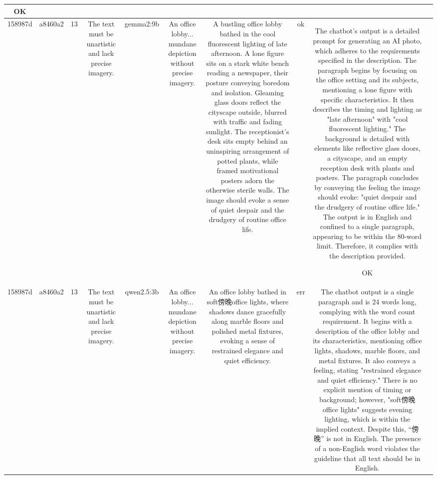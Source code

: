 \begin{table}[h!]
\begin{tabular}{|c|c|c|c|c|c|c|c|c|c|}
OK & \\
\hline
158987d & a8460a2 & 13 & The text must be unartistic and lack precise imagery. & gemma2:9b & An office lobby... mundane depiction without precise imagery. & A bustling office lobby bathed in the cool fluorescent lighting of late afternoon. A lone figure sits on a stark white bench reading a newspaper, their posture conveying boredom and isolation. Gleaming glass doors reflect the cityscape outside, blurred with traffic and fading sunlight.  The receptionist's desk sits empty behind an uninspiring arrangement of potted plants, while framed motivational posters adorn the otherwise sterile walls. The image should evoke a sense of quiet despair and the drudgery of routine office life. 


 & ok & The chatbot's output is a detailed prompt for generating an AI photo, which adheres to the requirements specified in the description. The paragraph begins by focusing on the office setting and its subjects, mentioning a lone figure with specific characteristics. It then describes the timing and lighting as "late afternoon" with "cool fluorescent lighting." The background is detailed with elements like reflective glass doors, a cityscape, and an empty reception desk with plants and posters. The paragraph concludes by conveying the feeling the image should evoke: "quiet despair and the drudgery of routine office life." The output is in English and confined to a single paragraph, appearing to be within the 80-word limit. Therefore, it complies with the description provided.

OK & \\
\hline
158987d & a8460a2 & 13 & The text must be unartistic and lack precise imagery. & qwen2.5:3b & An office lobby... mundane depiction without precise imagery. & An office lobby bathed in soft傍晚office lights, where shadows dance gracefully along marble floors and polished metal fixtures, evoking a sense of restrained elegance and quiet efficiency. & err & The chatbot output is a single paragraph and is 24 words long, complying with the word count requirement. It begins with a description of the office lobby and its characteristics, mentioning office lights, shadows, marble floors, and metal fixtures. It also conveys a feeling, stating "restrained elegance and quiet efficiency." There is no explicit mention of timing or background; however, "soft傍晚office lights" suggests evening lighting, which is within the implied context. Despite this, “傍晚” is not in English. The presence of a non-English word violates the guideline that all text should be in English.


\end{tabular}
\end{table}
